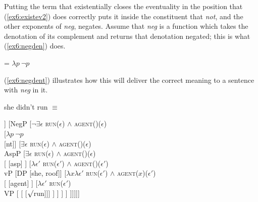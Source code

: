 Putting the term that existentially closes the eventuality in the position that (\ref{ex6:existev2}) does correctly puts it inside the constituent that \emph{not}, and the other exponents of \emph{neg}, negates. Assume that \emph{neg} is a function which takes the denotation of its complement and returns that denotation negated; this is what (\ref{ex6:negden}) does.%
%
%
%
\begin{exe}
\raggedright
	\ex \label{ex6:negden}
	 = $\lambda p\ \neg p$
\end{exe}
(\ref{ex6:negdent}) illustrates how this will deliver the correct meaning to a sentence with \emph{neg} in it.
\pagebreak
\begin{exe}
\raggedright
	\sn she didn't run $\equiv$
	\ex \label{ex6:negdent}
	\small
	\begin{forest}
		[$\neg \exists \epsilon$ \textsc{run}($\epsilon$) $\wedge$ \textsc{agent}(\denotes{she})($\epsilon$)\\TP
		[\ibar{T}
		[\obar{T} [did]]
		[NegP
			[$\neg \exists \epsilon$ \textsc{run}($\epsilon$) $\wedge$ \textsc{agent}()($\epsilon$)\\
			[$\lambda p\ \neg p$\\ [nt]]
		[$\exists \epsilon$ \textsc{run}($\epsilon$) $\wedge$ \textsc{agent}()($\epsilon$)\\AspP
			[$\exists \epsilon$ \textsc{run}($\epsilon$) $\wedge$ \textsc{agent}()($\epsilon$)\\ 
				[ [asp] ]
				[$\lambda \epsilon'$ \textsc{run}($\epsilon'$) $\wedge$ \textsc{agent}()($\epsilon'$) \\vP
					[DP [she, roof]]
					[$\lambda x \lambda \epsilon'$ \textsc{run}($\epsilon'$) $\wedge$ \textsc{agent}($x$)($\epsilon'$) \\  
						[ [agent] ]
						[$\lambda \epsilon'$ \textsc{run}($\epsilon'$) \\VP [ [ [$\surd$run]]] ]
					]
				 ]
			]
		]]]]]
		\end{forest}
\end{exe}

